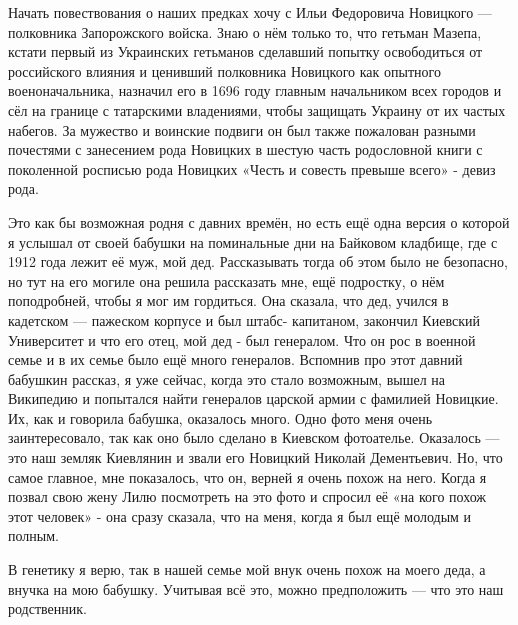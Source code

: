 Начать повествования о наших предках хочу с Ильи Федоровича Новицкого —
полковника  Запорожского войска. Знаю о нём только то, что гетьман Мазепа,
кстати первый из Украинских гетьманов сделавший  попытку  освободиться от
российского влияния и ценивший  полковника Новицкого как опытного
военоначальника, назначил его в 1696 году  главным начальником всех городов и
сёл на границе с татарскими владениями, чтобы защищать Украину от их частых
набегов. За мужество и воинские подвиги он был также пожалован разными
почестями с занесением рода Новицких в шестую часть родословной книги с
поколенной  росписью рода Новицких «Честь и совесть превыше всего» - девиз
рода.                       

Это  как бы возможная родня с давних времён, но есть ещё одна версия о которой
я услышал от своей бабушки на поминальные дни на Байковом кладбище, где с 1912
года лежит её муж, мой дед. Рассказывать тогда об этом было не безопасно, но
тут на его могиле она решила рассказать мне, ещё подростку, о нём поподробней,
чтобы я мог им гордиться. Она сказала, что дед, учился в кадетском — пажеском
корпусе и был штабс- капитаном, закончил Киевский Университет и что его отец,
мой дед - был генералом. Что он рос в военной семье и в их семье было ещё много
генералов. Вспомнив про этот давний  бабушкин рассказ, я уже сейчас, когда это
стало возможным, вышел на Википедию и попытался найти генералов царской армии с
фамилией Новицкие. Их, как и говорила бабушка, оказалось много. Одно фото меня
очень заинтересовало, так как оно было сделано в Киевском  фотоателье.
Оказалось — это наш земляк Киевлянин и звали его Новицкий Николай Дементьевич.
Но, что самое главное, мне показалось, что он, верней я очень похож на него.
Когда я позвал свою жену Лилю посмотреть на  это фото и спросил её «на кого
похож этот человек» - она сразу сказала, что на меня, когда я был ещё  молодым
и полным.

В генетику я верю, так  в нашей семье мой внук очень похож на моего деда, а
внучка на мою бабушку. Учитывая всё это,  можно предположить — что это наш
родственник.

